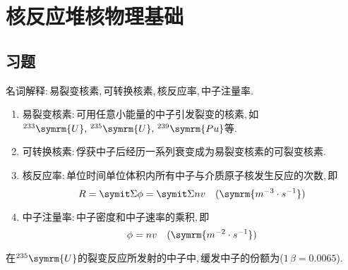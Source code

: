 \chapter{核反应堆核物理基础}

\section*{习题}

\begin{exercise}
    名词解释:\,易裂变核素,\,可转换核素,\,核反应率,\,中子注量率. 
    \begin{solution}
        \begin{enumerate}[(1)]
            \item 易裂变核素:\,可用任意小能量的中子引发裂变的核素,\,如${}^{233}\symrm{U},\,{}^{235}\symrm{U},\,{}^{239}\symrm{Pu}$等. 
            \item 可转换核素:\,俘获中子后经历一系列衰变成为易裂变核素的可裂变核素. 
            \item 核反应率:\,单位时间单位体积内所有中子与介质原子核发生反应的次数,\,即
            \begin{equation*}
                R = \vSigma \phi = \vSigma n v \quad (\symrm{m^{-3}\cdot s^{-1}})
            \end{equation*}
            \item 中子注量率:\,中子密度和中子速率的乘积,\,即
            \begin{equation*}
                \phi = n v \quad (\symrm{m^{-2}\cdot s^{-1}})
            \end{equation*}
        \end{enumerate}
    \end{solution}
\end{exercise}

\begin{exercise}
    在${}^{235}\symrm{U}$的裂变反应所发射的中子中,\,缓发中子的份额为($1\,\beta = 0.0065$).
\end{exercise}

